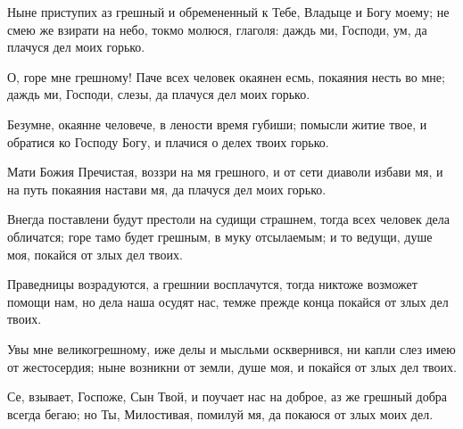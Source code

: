 \begin{mymulticols}





Ныне приступих аз грешный и обремененный к Тебе, Владыце и Богу моему; не смею же взирати на небо, токмо молюся, глаголя: даждь ми, Господи, ум, да плачуся дел моих горько.


О, горе мне грешному! Паче всех человек окаянен есмь, покаяния несть во мне; даждь ми, Господи, слезы, да плачуся дел моих горько.

\slava

Безумне, окаянне человече, в лености время губиши; помысли житие твое, и обратися ко Господу Богу, и плачися о делех твоих горько.

\inyne

Мати Божия Пречистая, воззри на мя грешного, и от сети диаволи избави мя, и на путь покаяния настави мя, да плачуся дел моих горько.




Внегда поставлени будут престоли на судищи страшнем, тогда всех человек дела обличатся; горе тамо будет грешным, в муку отсылаемым; и то ведущи, душе моя, покайся от злых дел твоих.


Праведницы возрадуются, а грешнии восплачутся, тогда никтоже возможет помощи нам, но дела наша осудят нас, темже прежде конца покайся от злых дел твоих.

\slava

Увы мне великогрешному, иже делы и мысльми осквернився, ни капли слез имею от жестосердия; ныне возникни от земли, душе моя, и покайся от злых дел твоих.

\inyne

Се, взывает, Госпоже, Сын Твой, и поучает нас на доброе, аз же грешный добра всегда бегаю; но Ты, Милостивая, помилуй мя, да покаюся от злых моих дел.


\end{mymulticols}
